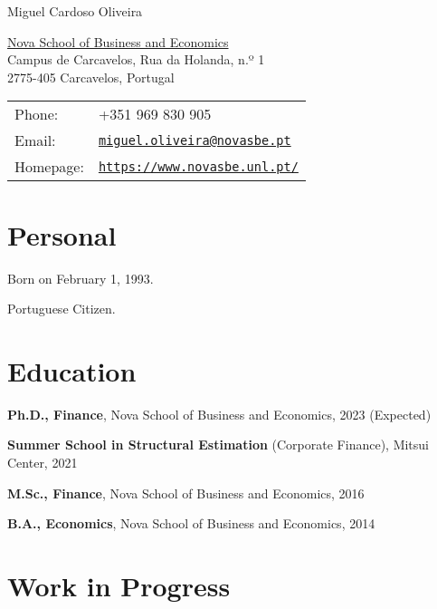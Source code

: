 \documentclass[letterpaper]{article}
\def\name{Miguel Cardoso Oliveira}
\renewenvironment{itemize}{
  \begin{list}{}{
    \setlength{\leftmargin}{1.5em}
  }
}{
  \end{list}
}
\begin{document}
{\huge \name}

\vspace{0.25in}

\begin{minipage}{0.45\linewidth}
  \href{https://www.novasbe.unl.pt/en/}{Nova School of Business and Economics} \\
  Campus de Carcavelos, Rua da Holanda, n.º 1 \\ 
  2775-405 Carcavelos, Portugal \\
\end{minipage}
\begin{minipage}{0.45\linewidth}
  \begin{tabular}{ll}
    Phone: & +351 969 830 905 \\
    Email: & \href{mailto:miguel.oliveira@novasbe.pt}{\tt miguel.oliveira@novasbe.pt} \\
    Homepage: & \href{https://www.novasbe.unl.pt/}{\tt https://www.novasbe.unl.pt/} \\
  \end{tabular}
\end{minipage}


\section*{Personal}

\begin{itemize}
\item Born on February 1, 1993.
\item Portuguese Citizen.
\end{itemize}


\section*{Education}

\begin{itemize}
  \item \textbf{Ph.D., Finance}, Nova School of Business and Economics, 2023 (Expected)
  \item \textbf{Summer School in Structural Estimation} (Corporate Finance), Mitsui Center, 2021
  \item \textbf{M.Sc., Finance}, Nova School of Business and Economics, 2016
  \item \textbf{B.A., Economics}, Nova School of Business and Economics, 2014
\end{itemize}

\section*{Work in Progress}
\end{document}
